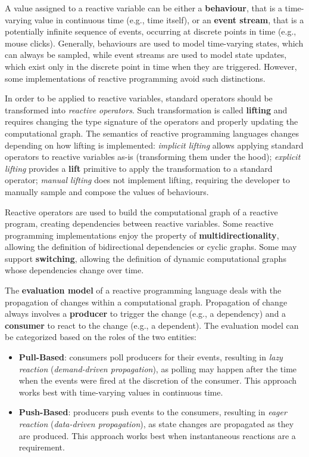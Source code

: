 A value assigned to a reactive variable can be either a \textbf{behaviour},
that is a time-varying value in continuous time (e.g., time itself), or an
\textbf{event stream}, that is a potentially infinite sequence of events,
occurring at discrete points in time (e.g., mouse clicks). Generally,
behaviours are used to model time-varying states, which can always be sampled,
while event streams are used to model state updates, which exist only in the
discrete point in time when they are triggered. However, some implementations
of reactive programming avoid such distinctions.

In order to be applied to reactive variables, standard operators should be
transformed into \textit{reactive operators}. Such transformation is called
\textbf{lifting} and requires changing the type signature of the operators and
properly updating the computational graph. The semantics of reactive
programming languages changes depending on how lifting is implemented:
\textit{implicit lifting} allows applying standard operators to reactive
variables as-is (transforming them under the hood); \textit{explicit lifting}
provides a \textbf{lift} primitive to apply the transformation to a standard
operator; \textit{manual lifting} does not implement lifting, requiring the
developer to manually sample and compose the values of behaviours.

Reactive operators are used to build the computational graph of a reactive
program, creating dependencies between reactive variables. Some reactive
programming implementations enjoy the property of \textbf{multidirectionality},
allowing the definition of bidirectional dependencies or cyclic graphs. Some
may support \textbf{switching}, allowing the definition of dynamic
computational graphs whose dependencies change over time.

The \textbf{evaluation model} of a reactive programming language deals with the
propagation of changes within a computational graph. Propagation of change
always involves a \textbf{producer} to trigger the change (e.g., a dependency)
and a \textbf{consumer} to react to the change (e.g., a dependent). The
evaluation model can be categorized based on the roles of the two entities:
\begin{itemize}
  \item \textbf{Pull-Based}: consumers poll producers for their events,
        resulting in \textit{lazy reaction} (\textit{demand-driven propagation}),
        as polling may happen after the time when the events were fired at the
        discretion of the consumer. This approach works best with time-varying
        values in continuous time.
  \item \textbf{Push-Based}: producers push events to the consumers, resulting
        in \textit{eager reaction} (\textit{data-driven propagation}), as state
        changes are propagated as they are produced. This approach works best
        when instantaneous reactions are a requirement.
\end{itemize}

